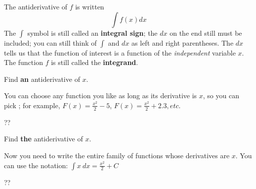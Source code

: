 \begin{tcolorbox}[title = {Notation for the antiderivative:}]
The antiderivative of $f$ is written
$$\int f(x) dx$$
The $\int$ symbol is still called an \textbf{integral sign}; the $dx$ on the end still must be included; you can still think of $\int$ and $dx$ as left and right parentheses. The $dx$ tells us that the function of interest is a function of the \emph{independent} variable $x$. The function $f$ is still called the \textbf{integrand}.
\end{tcolorbox}

\begin{example}
Find \textbf{an} antiderivative of $x$.
    \begin{sol}
    You can choose any function you like as long as its derivative is $x$, so you can pick ; for example, $F(x)=\displaystyle\frac{x^2}{2}-5$, $F(x)=\displaystyle\frac{x^2}{2}+2.3, etc.$ 
    \end{sol}
    \begin{solL}
    ??
    
    \end{solL}
    
\end{example}
\begin{example}
Find \textbf{the} antiderivative of $x$. 
    \begin{sol}
    Now you need to write the entire family of functions whose derivatives are $x$. You can use the notation: $\displaystyle\int x \  dx=\displaystyle\frac{x^2}{2}+C$ 
    \end{sol}
    \begin{solL}
   ??
    
    \end{solL}
    
\end{example}
